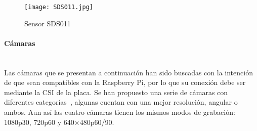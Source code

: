 \begin{figure}[H]
	\caption{Sensor SDS011}
	\texttt{[image: SDS011.jpg]}\label{fig:sds011}
\end{figure}
\endminipage\hfill
{}
\begin{table}[H]
	\centering
	\caption{Especificaciones módulo SDS011}
	\label{tab:sds011}
\end{table}
\endminipage

\pagebreak
\paragraph{Cámaras}\mbox{} \\
Las cámaras que se presentan a continuación han sido buscadas con la intención de que sean compatibles con la Raspberry Pi, por lo que su conexión debe ser mediante la CSI de la placa. Se han propuesto una serie de cámaras con diferentes categorías~\cite{cholewiak_raspberry_2017}, algunas cuentan con una mejor resolución, angular o ambos. Aun así las cuatro cámaras tienen los mismos modos de grabación: 1080p30, 720p60 y 640×480p60/90.

